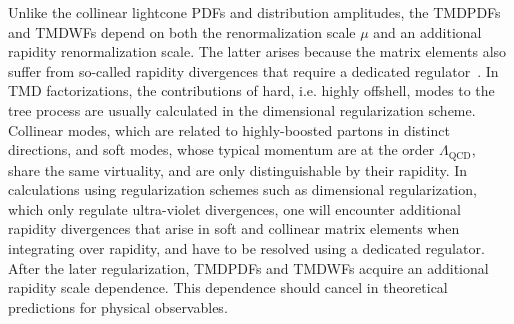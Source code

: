 \documentclass[prd,aps,twocolumn,preprintnumbers, showpacs, nofootinbib,superscriptaddress,notitlepage]{revtex4-1}
\begin{document}
Unlike the collinear  lightcone  PDFs and  distribution amplitudes,  the TMDPDFs and TMDWFs depend on both the renormalization scale $\mu$ and an additional rapidity renormalization scale. The latter arises because the matrix elements also suffer from so-called rapidity divergences that require a dedicated regulator~\cite{Collins:1981uk,Becher:2010tm,Chiu:2011qc}.  In TMD factorizations, the contributions of hard, i.e. highly offshell, modes to the tree process are usually calculated in the dimensional regularization scheme. Collinear modes, which are related to  highly-boosted partons in distinct directions, and soft modes, whose typical momentum are  at the order  $\Lambda_{\mathrm{QCD}}$, share the same virtuality, %
and are only distinguishable by their rapidity. In calculations using regularization schemes such as dimensional regularization, which only regulate ultra-violet divergences, one will encounter additional rapidity divergences that arise in soft and collinear matrix elements when integrating over rapidity, and have to be resolved using a dedicated regulator. After the later regularization, TMDPDFs and TMDWFs acquire an additional rapidity scale dependence. This dependence should cancel in theoretical predictions for physical observables. 
\end{document}
